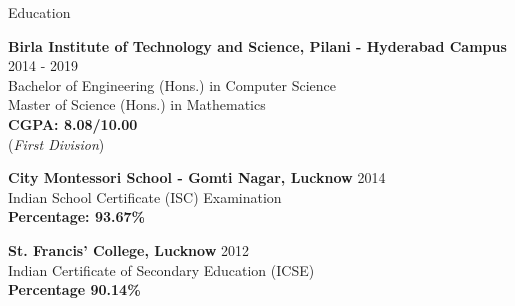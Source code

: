 \documentclass{resume} %
\begin{document}





\begin{rSection}{Education}

{\bf Birla Institute of Technology and Science, Pilani - Hyderabad Campus}  \hfill{2014 - 2019}
\\ Bachelor of Engineering (Hons.) in Computer Science \hfill {}
\\ Master of Science (Hons.) in Mathematics
\\{\bf CGPA: 8.08/10.00}  
\\(\textit{First Division})

{\bf City Montessori School - Gomti Nagar, Lucknow} \hfill {2014}
\\ Indian School Certificate (ISC) Examination
\\ {\bf Percentage: 93.67\%}

{\textbf{St. Francis' College, Lucknow}}  \hfill {2012}
\\Indian Certificate of Secondary Education (ICSE)
\\{\bf Percentage 90.14\%}




\end{rSection}
\end{document}
